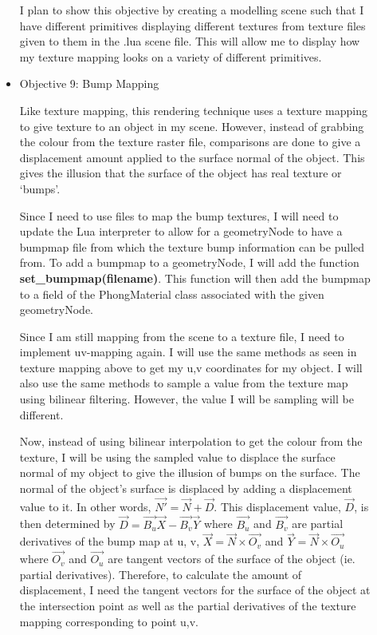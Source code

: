 \documentclass {article}
\begin{document}
\begin{description}
\begin{itemize}
	\cite{blinn_newell} \cite{lectures_text} \newline
	
	I plan to show this objective by creating a modelling scene such that I have different primitives displaying different textures from texture files given to them in the .lua scene file. This will allow me to display how my texture mapping looks on a variety of different primitives. \newline
    	 
    	 \item Objective 9: Bump Mapping\newline
    	 
	 Like texture mapping, this rendering technique uses a texture mapping to give texture to an object in my scene. However, instead of grabbing the colour from the texture raster file, comparisons are done to give a displacement amount applied to the surface normal of the object. This gives the illusion that the surface of the object has real texture or ‘bumps’. \newline
	
	 Since I need to use files to map the bump textures, I will need to update the Lua interpreter to allow for a geometryNode to have a bumpmap file from which the texture bump information can be pulled from. To add a bumpmap to a geometryNode, I will add the function {\bf set\_bumpmap(filename)}. This function will then add the bumpmap to a field of the PhongMaterial class associated with the given geometryNode. \newline
	
	 Since I am still mapping from the scene to a texture file, I need to implement uv-mapping again. I will use the same methods as seen in texture mapping above to get my u,v coordinates for my object. I will also use the same methods to sample a value from the texture map using bilinear filtering. However, the value I will be sampling will be different. \newline
	
	 Now, instead of using bilinear interpolation to get the colour from the texture, I will be using the sampled value to displace the surface normal of my object to give the illusion of bumps on the surface. The normal of the object's surface is displaced by adding a displacement value to it. In other words, $\vec{N'} = \vec{N} + \vec{D}$. This displacement value, $\vec{D}$, is then determined by $\vec{D} = \vec{B_u} \vec{X} - \vec{B_v }\vec{Y}$ where $\vec{B_u}$ and $\vec{B_v}$ are partial derivatives of the bump map at u, v, $\vec{X} = \vec{N} \times \vec{O_v}$ and $\vec{Y} = \vec{N} \times \vec{O_u}$ where $\vec{O_v}$ and $\vec{O_u}$ are tangent vectors of the surface of the object (ie. partial derivatives). Therefore, to calculate the amount of displacement, I need the tangent vectors for the surface of the object at the intersection point as well as the partial derivatives of the texture mapping corresponding to point u,v. \newline
	

\end{itemize}
\end{description}
\end{document}
